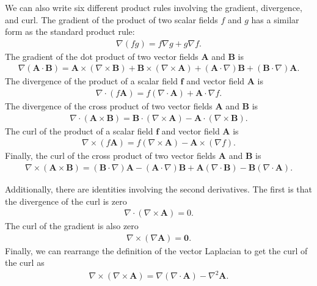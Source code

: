 We can also write six different product rules involving the gradient, divergence, and curl. The gradient of the product of two scalar fields $f$ and $g$ has a similar form as the standard product rule:
\begin{align}
  \nabla ( f g ) = f \nabla g + g \nabla f.
\end{align}
The gradient of the dot product of two vector fields $\mathbf{A}$ and $\mathbf{B}$ is
\begin{align}
  \nabla ( \mathbf{A} \cdot \mathbf{B} ) = 
  \mathbf{A} \times ( \nabla \times \mathbf{B} ) + \mathbf{B} \times ( \nabla \times \mathbf{A} ) 
  + ( \mathbf{A} \cdot \nabla ) \mathbf{B} + ( \mathbf{B} \cdot \nabla ) \mathbf{A}.
\end{align}
The divergence of the product of a scalar field $\mathbf{f}$ and vector field $\mathbf{A}$ is
\begin{align}
  \nabla \cdot ( f \mathbf{A} ) = f ( \nabla \cdot \mathbf{A} ) + \mathbf{A} \cdot \nabla f .
\end{align}
The divergence of the cross product of two vector fields $\mathbf{A}$ and $\mathbf{B}$ is
\begin{align}
  \nabla \cdot ( \mathbf{A} \times \mathbf{B} ) = \mathbf{B} \cdot ( \nabla \times \mathbf{A} ) - \mathbf{A} \cdot ( \nabla \times \mathbf{B} ) .
\end{align}
The curl of the product of a scalar field $\mathbf{f}$ and vector field $\mathbf{A}$ is
\begin{align}
  \nabla \times ( f \mathbf{A} ) = f ( \nabla \times \mathbf{A} ) - \mathbf{A} \times ( \nabla f ) .
\end{align}
Finally, the curl of the cross product of two vector fields $\mathbf{A}$ and $\mathbf{B}$ is
\begin{align}
  \nabla \times ( \mathbf{A} \times \mathbf{B} ) = (
  \mathbf{B} \cdot \nabla ) \mathbf{A} - ( \mathbf{A} \cdot \nabla ) \mathbf{B} + \mathbf{A} ( \nabla \cdot \mathbf{B} ) - \mathbf{B} ( \nabla \cdot \mathbf{A} ) .
\end{align}

Additionally, there are identities involving the second derivatives. The first is that the divergence of the curl is zero
\begin{align}
  \nabla \cdot ( \nabla \times \mathbf{A} ) = 0.
\end{align}
The curl of the gradient is also zero
\begin{align}
  \nabla \times ( \nabla \mathbf{A} ) = \mathbf{0}.
\end{align}
Finally, we can rearrange the definition of the vector Laplacian to get the curl of the curl as
\begin{align}
   \nabla \times ( \nabla \times \mathbf{A} ) = \nabla ( \nabla \cdot \mathbf{A} ) - \nabla^2 \mathbf{A}.
\end{align}

